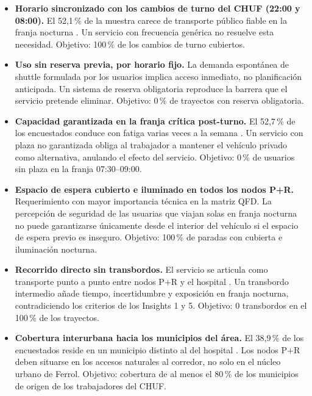 \begin{itemize}

	\item \textbf{Horario sincronizado con los cambios de turno del CHUF
	(22:00 y 08:00).} El 52,1\,\% de la muestra carece de transporte
	público fiable en la franja nocturna \parencite{LouridoRegueira2026}.
	Un servicio con frecuencia genérica no resuelve esta necesidad.
	Objetivo: 100\,\% de los cambios de turno cubiertos.

	\item \textbf{Uso sin reserva previa, por horario fijo.}
	La demanda espontánea de shuttle formulada por los usuarios
	\parencite{LouridoRegueira2026} implica acceso inmediato, no
	planificación anticipada. Un sistema de reserva obligatoria
	reproduce la barrera que el servicio pretende eliminar.
	Objetivo: 0\,\% de trayectos con reserva obligatoria.

	\item \textbf{Capacidad garantizada en la franja crítica post-turno.}
	El 52,7\,\% de los encuestados conduce con fatiga varias veces a la
	semana \parencite{LouridoRegueira2026}. Un servicio con plaza no
	garantizada obliga al trabajador a mantener el vehículo privado como
	alternativa, anulando el efecto del servicio.
	Objetivo: 0\,\% de usuarios sin plaza en la franja 07:30--09:00.

	\item \textbf{Espacio de espera cubierto e iluminado en todos los
	nodos P+R.} Requerimiento con mayor importancia técnica en la
	matriz QFD. La percepción de seguridad de las usuarias que viajan
	solas en franja nocturna \parencite{LouridoRegueira2026} no puede
	garantizarse únicamente desde el interior del vehículo si el espacio
	de espera previo es inseguro.
	Objetivo: 100\,\% de paradas con cubierta e iluminación nocturna.

	\item \textbf{Recorrido directo sin transbordos.}
	El servicio se articula como transporte punto a punto entre nodos
	P+R y el hospital \parencite{LouridoRegueira2026}. Un transbordo
	intermedio añade tiempo, incertidumbre y exposición en franja
	nocturna, contradiciendo los criterios de los Insights 1 y 5.
	Objetivo: 0 transbordos en el 100\,\% de los trayectos.

	\item \textbf{Cobertura interurbana hacia los municipios del área.}
	El 38,9\,\% de los encuestados reside en un municipio distinto al
	del hospital \parencite{LouridoRegueira2026}. Los nodos P+R deben
	situarse en los accesos naturales al corredor, no solo en el núcleo
	urbano de Ferrol. Objetivo: cobertura de al menos el 80\,\% de los
	municipios de origen de los trabajadores del CHUF.


\end{itemize}
